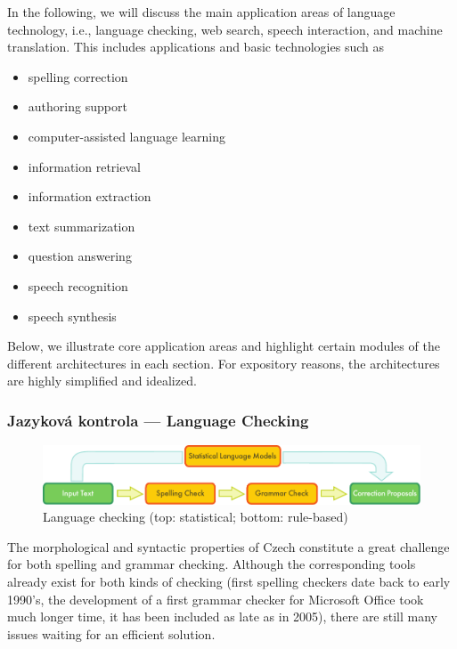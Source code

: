 \documentclass[]{../../metanetpaper}
\begin{document}
\begin{multicols}{2}
In the following, we will discuss the main application areas of language technology, i.e., language checking, web search, speech interaction, and machine translation. This includes applications and basic technologies such as
\begin{itemize}
  \item spelling correction
  \item authoring support
  \item computer-assisted language learning
  \item information retrieval
  \item information extraction
  \item text summarization
  \item question answering
  \item speech recognition
  \item speech synthesis
\end{itemize}
Below, we illustrate core application areas and highlight certain modules of the different architectures in each section. For expository reasons, the architectures are highly simplified and idealized.

\subsubsection{Jazyková kontrola --- Language Checking}

  \begin{figure}[t]
  \center
  \includegraphics[width=\textwidth]{../_media/english/language_checking}
  \caption{Language checking (top: statistical; bottom: rule-based)}
  \label{fig:langcheckingaarch_en}
\end{figure}

The morphological and syntactic properties of Czech constitute a great challenge for both spelling and grammar checking. Although the corresponding tools already exist for both kinds of checking (first spelling checkers date back to early 1990’s, the development of a first grammar checker for Microsoft Office took much longer time, it has been included as late as in 2005), there are still many issues waiting for an efficient solution.


\end{multicols}
\end{document}
